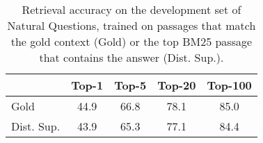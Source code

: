\documentclass[11pt,a4paper]{article}
\newcommand\tf[1]{\textbf{#1}}
\begin{document}
\begin{table}[t!]
    \setlength\tabcolsep{5pt}
    \centering
    \begin{tabular}{lcccc} \toprule
         & \tf{Top-1} & \tf{Top-5} & \tf{Top-20} & \tf{Top-100}  \\ \midrule
        {Gold} & 44.9 & 66.8 & 78.1 & 85.0 \\
        {Dist. Sup.} & 43.9 & 65.3 & 77.1 & 84.4 \\
    \bottomrule
    \end{tabular}
    \caption{
    Retrieval accuracy on the development set of Natural Questions, trained on passages that match the gold context (Gold) or the top BM25 passage that contains the answer (Dist. Sup.).
    }
    \label{tab:qa_ir_dist_sv}
\end{table}
\end{document}
